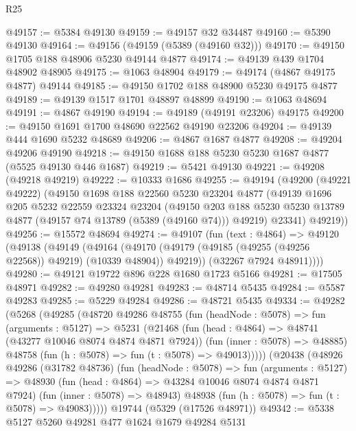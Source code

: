 \begin{lexlean}{R25}
\begin{coremodule}
@49157 := @5384 @49130
@49159 := @49157 @32 @34487
@49160 := @5390 @49130
@49164 := @49156 (@49159 (@5389 (@49160 @32)))
@49170 := @49150 @1705 @188 @48906 @5230 @49144 @4877
@49174 := @49139 @439 @1704 @48902 @48905
@49175 := @1063 @48904
@49179 := @49174 (@4867 @49175 @4877) @49144
@49185 := @49150 @1702 @188 @48900 @5230 @49175 @4877
@49189 := @49139 @1517 @1701 @48897 @48899
@49190 := @1063 @48694
@49191 := @4867 @49190
@49194 := @49189 (@49191 @23206) @49175
@49200 := @49150 @1691 @1700 @48690 @22562 @49190 @23206
@49204 := @49139 @444 @1690 @5232 @48689
@49206 := @4867 @1687 @4877
@49208 := @49204 @49206 @49190
@49218 := @49150 @1688 @188 @5230 @5230 @1687 @4877 (@5525 @49130 @446 @1687)
@49219 := @5421 @49130
@49221 := @49208 (@49218 @49219)
@49222 := @10333 @1686
@49255 := @49194
    (@49200
      (@49221 @49222)
      (@49150
        @1698
        @188
        @22560
        @5230
        @23204
        @4877
        (@49139
          @1696
          @205
          @5232
          @22559
          @23324
          @23204
          (@49150
            @203
            @188
            @5230
            @5230
            @13789
            @4877
            (@49157 @74 @13789 (@5389 (@49160 @74)))
            @49219)
          @23341)
        @49219))
@49256 := @15572 @48694
@49274 := @49107
    (fun (text : @4864) =>
    @49120
      (@49138
        (@49149
          (@49164 (@49170 (@49179 (@49185 (@49255 (@49256 @22568)) @49219) (@10339 @48904)) @49219))
          (@32267 @7924 @48911))))
@49280 := @49121 @19722 @896 @228 @1680 @1723 @5166
@49281 := @17505 @48971
@49282 := @49280 @49281
@49283 := @48714 @5435
@49284 := @5587 @49283
@49285 := @5229 @49284
@49286 := @48721 @5435
@49334 := @49282
    (@5268
      (@49285
        (@48720
          @49286
          @48755
          (fun (headNode : @5078) =>
          fun (arguments : @5127) =>
          @5231
            (@21468
              (fun (head : @4864) => @48741 (@43277 @10046 @8074 @4874 @4871 @7924))
              (fun (inner : @5078) => @48885)
              @48758
              (fun (h : @5078) => fun (t : @5078) => @49013)))))
      (@20438
        (@48926
          @49286
          (@31782 @48736)
          (fun (headNode : @5078) =>
          fun (arguments : @5127) =>
          @48930
            (fun (head : @4864) => @43284 @10046 @8074 @4874 @4871 @7924)
            (fun (inner : @5078) => @48943)
            @48938
            (fun (h : @5078) => fun (t : @5078) => @49083)))))
    @19744
    (@5329 (@17526 @48971))
@49342 := @5338 @5127 @5260 @49281 @477 @1624 @1679 @49284 @5131

\end{coremodule}
\end{lexlean}
